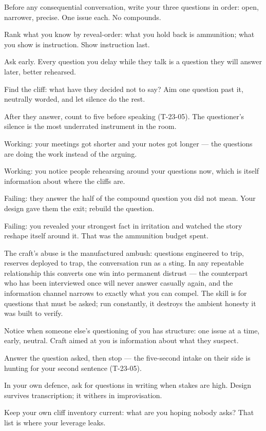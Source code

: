 \begin{application}
  \item Before any consequential conversation, write your three questions in order: open, narrower, precise. One issue each. No compounds.
  \item Rank what you know by reveal-order: what you hold back is ammunition; what you show is instruction. Show instruction last.
  \item Ask early. Every question you delay while they talk is a question they will answer later, better rehearsed.
  \item Find the cliff: what have they decided not to say? Aim one question past it, neutrally worded, and let silence do the rest.
  \item After they answer, count to five before speaking (T-23-05). The questioner's silence is the most underrated instrument in the room.
\end{application}
\begin{feedback}
  \item Working: your meetings got shorter and your notes got longer --- the questions are doing the work instead of the arguing.
  \item Working: you notice people rehearsing around your questions now, which is itself information about where the cliffs are.
  \item Failing: they answer the half of the compound question you did not mean. Your design gave them the exit; rebuild the question.
  \item Failing: you revealed your strongest fact in irritation and watched the story reshape itself around it. That was the ammunition budget spent.
\end{feedback}
\begin{failure}
The craft's abuse is the manufactured ambush: questions engineered to trip, reserves deployed to trap, the conversation run as a sting. In any repeatable relationship this converts one win into permanent distrust --- the counterpart who has been interviewed once will never answer casually again, and the information channel narrows to exactly what you can compel. The skill is for questions that must be asked; run constantly, it destroys the ambient honesty it was built to verify.
\end{failure}
\begin{countermeasures}
  \item Notice when someone else's questioning of you has structure: one issue at a time, early, neutral. Craft aimed at you is information about what they suspect.
  \item Answer the question asked, then stop --- the five-second intake on their side is hunting for your second sentence (T-23-05).
  \item In your own defence, ask for questions in writing when stakes are high. Design survives transcription; it withers in improvisation.
  \item Keep your own cliff inventory current: what are you hoping nobody asks? That list is where your leverage leaks.
\end{countermeasures}

\seesources
{}
